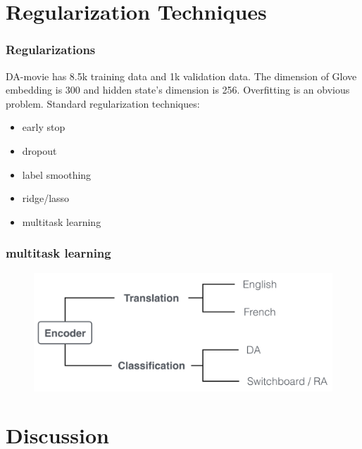 \documentclass{beamer}
\begin{document}
\section{Regularization Techniques}
\frame{\tableofcontents[currentsection]}
\begin{frame}
\frametitle{Regularizations}
DA-movie has 8.5k training data and 1k validation data.  The dimension of Glove embedding is 300 and hidden state's dimension is 256. Overfitting is an obvious problem. 
Standard regularization techniques: 
\begin{itemize}
\item early stop
\item dropout
\item label smoothing
\item ridge/lasso
\item multitask learning

\end{itemize}


\end{frame}




\begin{frame}
\frametitle{multitask learning}
\begin{figure}
\includegraphics[scale=0.3]{summary.png}
\end{figure}


\end{frame}



















\section{Discussion}
\end{document}
